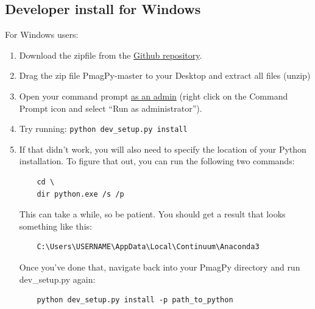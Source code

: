 \documentclass[11pt]{book}
\begin{document}
{\subsection{Developer install for Windows}

For Windows users:

\begin{enumerate}

\item  Download the zipfile from the \href{https://github.com/PmagPy/PmagPy}{Github repository}.

\item Drag the zip file PmagPy-master to your Desktop and extract all files (unzip)

\item Open your command prompt \href{http://www.thewindowsclub.com/how-to-run-command-prompt-as-an-administrator}{as an admin} (right click on the Command Prompt icon and select ``Run as administrator'').



\item Try running: \verb!python dev_setup.py install!

\item  If that didn't work, you will also need to specify the location of your Python installation.  To figure that out, you can run the following two commands:
\begin{verbatim}
    cd \
    dir python.exe /s /p
\end{verbatim}

This can take a while, so be patient.  You should get a result that looks something like this:

\begin{verbatim}
    C:\Users\USERNAME\AppData\Local\Continuum\Anaconda3
\end{verbatim}

Once you've done that, navigate back into your PmagPy directory and run dev\_setup.py again:

\begin{verbatim}
    python dev_setup.py install -p path_to_python
\end{verbatim}


\end{enumerate}}
\end{document}
